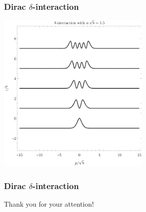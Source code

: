 \documentclass{beamer}
\begin{document}
\begin{frame}
    \frametitle{Dirac $\delta$-interaction}
    \centering
    \includegraphics[height=225pt]{plots/dirac18.pdf}
\end{frame}

\begin{frame}
    \frametitle{Dirac $\delta$-interaction}
    \centering
\end{frame}

\begin{frame}
    \centering \Large
    Thank you for your attention!
\end{frame}
\end{document}
